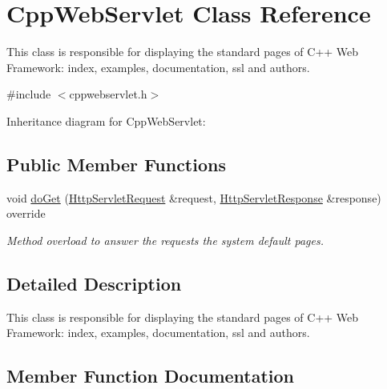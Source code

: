 \hypertarget{class_cpp_web_servlet}{}\section{Cpp\+Web\+Servlet Class Reference}
\label{class_cpp_web_servlet}


This class is responsible for displaying the standard pages of C++ Web Framework\+: index, examples, documentation, ssl and authors.  




{\ttfamily \#include $<$cppwebservlet.\+h$>$}



Inheritance diagram for Cpp\+Web\+Servlet\+:
\subsection*{Public Member Functions}
\begin{DoxyCompactItemize}
\item 
void \mbox{\hyperlink{class_cpp_web_servlet_a8d32d5ba8ba73c10a7c1abc81497d898}{do\+Get}} (\mbox{\hyperlink{class_http_servlet_request}{Http\+Servlet\+Request}} \&request, \mbox{\hyperlink{class_http_servlet_response}{Http\+Servlet\+Response}} \&response) override
\begin{DoxyCompactList}\small\item\em Method overload to answer the requests the system default pages. \end{DoxyCompactList}\end{DoxyCompactItemize}


\subsection{Detailed Description}
This class is responsible for displaying the standard pages of C++ Web Framework\+: index, examples, documentation, ssl and authors. 

\subsection{Member Function Documentation}
\mbox{\label{class_cpp_web_servlet_a8d32d5ba8ba73c10a7c1abc81497d898}} 
